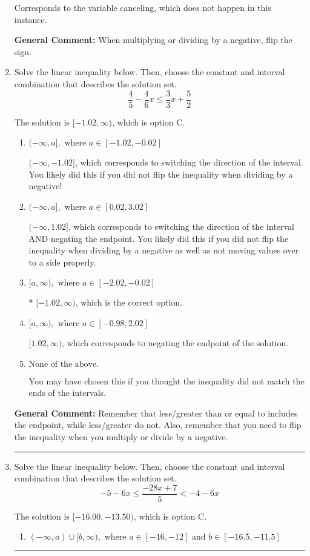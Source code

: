 \documentclass{extbook}[14pt]
\newcommand{\litem}[1]{\item #1

\rule{\textwidth}{0.4pt}}
\begin{document}
\begin{enumerate}
{\begin{enumerate}[label=\Alph*.]
Corresponds to the variable canceling, which does not happen in this instance.
\end{enumerate}

\textbf{General Comment:} When multiplying or dividing by a negative, flip the sign.
}
\litem{
Solve the linear inequality below. Then, choose the constant and interval combination that describes the solution set.
\[ \frac{4}{5} - \frac{4}{6} x \leq \frac{3}{3} x + \frac{5}{2} \]

The solution is \( [-1.02, \infty) \), which is option C.\begin{enumerate}[label=\Alph*.]
\item \( (-\infty, a], \text{ where } a \in [-1.02, -0.02] \)

 $(-\infty, -1.02]$, which corresponds to switching the direction of the interval. You likely did this if you did not flip the inequality when dividing by a negative!
\item \( (-\infty, a], \text{ where } a \in [0.02, 3.02] \)

 $(-\infty, 1.02]$, which corresponds to switching the direction of the interval AND negating the endpoint. You likely did this if you did not flip the inequality when dividing by a negative as well as not moving values over to a side properly.
\item \( [a, \infty), \text{ where } a \in [-2.02, -0.02] \)

* $[-1.02, \infty)$, which is the correct option.
\item \( [a, \infty), \text{ where } a \in [-0.98, 2.02] \)

 $[1.02, \infty)$, which corresponds to negating the endpoint of the solution.
\item \( \text{None of the above}. \)

You may have chosen this if you thought the inequality did not match the ends of the intervals.
\end{enumerate}

\textbf{General Comment:} Remember that less/greater than or equal to includes the endpoint, while less/greater do not. Also, remember that you need to flip the inequality when you multiply or divide by a negative.
}
\litem{
Solve the linear inequality below. Then, choose the constant and interval combination that describes the solution set.
\[ -5 - 6 x \leq \frac{-28 x + 7}{5} < -4 - 6 x \]

The solution is \( [-16.00, -13.50) \), which is option C.\begin{enumerate}[label=\Alph*.]
\item \( (-\infty, a) \cup [b, \infty), \text{ where } a \in [-16, -12] \text{ and } b \in [-16.5, -11.5] \)


\end{enumerate}}
\end{enumerate}
\end{document}
